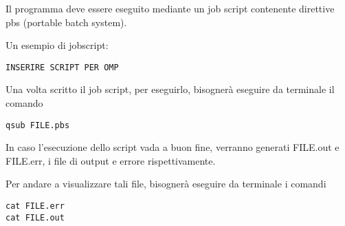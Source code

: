 Il programma deve essere eseguito mediante un job script contenente direttive pbs (portable batch system).

Un esempio di jobscript:
\begin{lstlisting}
INSERIRE SCRIPT PER OMP
\end{lstlisting}

Una volta scritto il job script, per eseguirlo, bisognerà eseguire da terminale il comando 
\begin{lstlisting}
qsub FILE.pbs
\end{lstlisting}

In caso l'esecuzione dello script vada a buon fine, verranno generati FILE.out e FILE.err, i file di output e errore rispettivamente.

Per andare a visualizzare tali file, bisognerà eseguire da terminale i comandi
\begin{lstlisting}
cat FILE.err
cat FILE.out
\end{lstlisting}